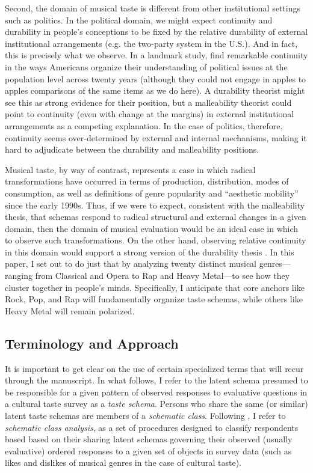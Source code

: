 \documentclass[preprint, authoryear,11pt, 3p]{elsarticle}
\begin{document}
Second, the domain of musical taste is different from other institutional settings such as politics. In the political domain, we might expect continuity and durability in people's conceptions to be fixed by the relative durability of external institutional arrangements (e.g. the two-party system in the U.S.). And in fact, this is precisely what we observe. In a landmark study, \citet{baldassarri2014neither} find remarkable continuity in the ways Americans organize their understanding of political issues at the population level across twenty years (although they could not engage in apples to apples comparisons of the same items as we do here). A durability theorist might see this as strong evidence for their position, but a malleability theorist could point to continuity (even with change at the margins) in external institutional arrangements as a competing explanation. In the case of politics, therefore, continuity seems over-determined by external and internal mechanisms, making it hard to adjudicate between the durability and malleability positions. 

Musical taste, by way of contrast, represents a case in which radical transformations have occurred in terms of production, distribution, modes of consumption, as well as definitions of genre popularity and ``aesthetic mobility'' \citep{baumann2001intellectualization} since the early 1990s. Thus, if we were to expect, consistent with the malleability thesis, that schemas respond to radical structural and external changes in a given domain, then the domain of musical evaluation would be an ideal case in which to observe such transformations. On the other hand, observing relative continuity in this domain would support a strong version of the durability thesis \citep{vaisey2016cultural}. In this paper, I set out to do just that by analyzing twenty distinct musical genres—ranging from Classical and Opera to Rap and Heavy Metal—to see how they cluster together in people's minds. Specifically, I anticipate that core anchors like Rock, Pop, and Rap will fundamentally organize taste schemas, while others like Heavy Metal will remain polarized. 

\subsection{Terminology and Approach}
It is important to get clear on the use of certain specialized terms that will recur through the manuscript. In what follows, I refer to the latent schema presumed to be responsible for a given pattern of observed responses to evaluative questions in a cultural taste survey as a \emph{taste schema}. Persons who share the same (or similar) latent taste schemas are members of a \emph{schematic class}. Following \citep{boutyline2017improving}, I refer to \emph{schematic class analysis}, as a set of procedures designed to classify respondents based based on their sharing latent schemas governing their observed (usually evaluative) ordered responses to a given set of objects in survey data (such as likes and dislikes of musical genres in the case of cultural taste). 
\end{document}
